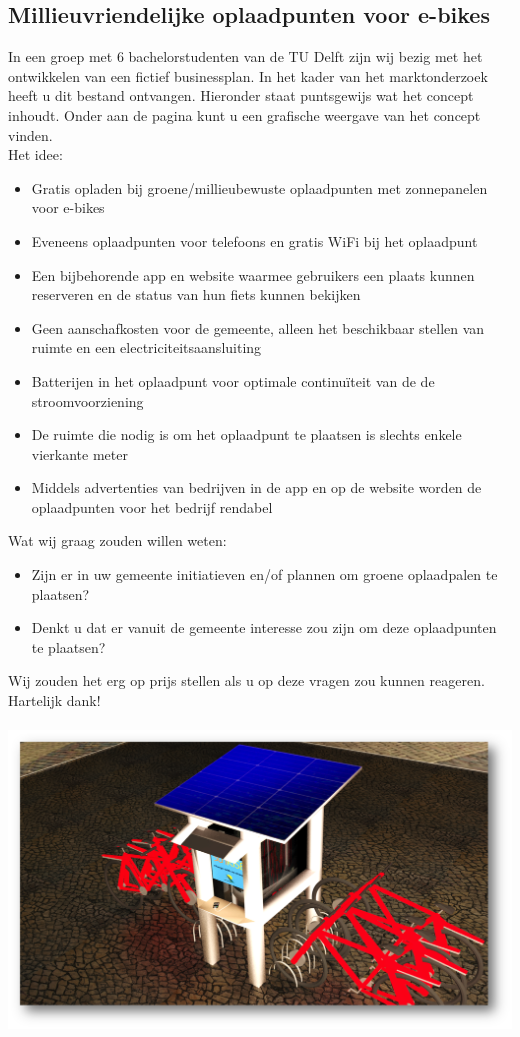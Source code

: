 \documentclass[11pt,a4paper]{article}
\begin{document}
\begin{center}
\section*{Millieuvriendelijke oplaadpunten voor e-bikes}
\end{center}
In een groep met 6 bachelorstudenten van de TU Delft zijn wij bezig met het ontwikkelen van een fictief businessplan. In het kader van het marktonderzoek heeft u dit bestand ontvangen. Hieronder staat puntsgewijs wat het concept inhoudt. Onder aan de pagina kunt u een grafische weergave van het concept vinden.\\

Het idee:
\begin{itemize}
\item Gratis opladen bij groene/millieubewuste oplaadpunten met zonnepanelen voor e-bikes
\item Eveneens oplaadpunten voor telefoons en gratis WiFi bij het oplaadpunt
\item Een bijbehorende app en website waarmee gebruikers een plaats kunnen reserveren en de status van hun fiets kunnen bekijken
\item Geen aanschafkosten voor de gemeente, alleen het beschikbaar stellen van ruimte en een electriciteitsaansluiting
\item Batterijen in het oplaadpunt voor optimale continu\"iteit van de de stroomvoorziening
\item De ruimte die nodig is om het oplaadpunt te plaatsen is slechts enkele vierkante meter
\item Middels advertenties van bedrijven in de app en op de website worden de oplaadpunten voor het bedrijf rendabel

\end{itemize}

Wat wij graag zouden willen weten:
\begin{itemize}
\item Zijn er in uw gemeente initiatieven en/of plannen om groene oplaadpalen te plaatsen?
\item Denkt u dat er vanuit de gemeente interesse zou zijn om deze oplaadpunten te plaatsen? 
\end{itemize}

Wij zouden het erg op prijs stellen als u op deze vragen zou kunnen reageren.\\
Hartelijk dank!\\\\

\includegraphics[width=\textwidth]{render2.png}

\thispagestyle{empty}
\end{document}
